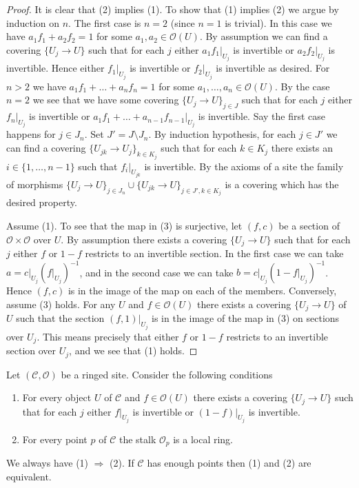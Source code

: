\begin{proof}
It is clear that (2) implies (1). To show that (1) implies (2) we argue by
induction on $n$. The first case is $n = 2$ (since $n = 1$ is trivial).
In this case we have $a_1f_1 + a_2f_2 = 1$ for some
$a_1, a_2 \in \mathcal{O}(U)$. By assumption we can find a covering
$\{U_j \to U\}$ such that for each $j$
either $a_1f_1|_{U_j}$ is invertible or $a_2f_2|_{U_j}$ is invertible.
Hence either $f_1|_{U_j}$ is invertible or $f_2|_{U_j}$ is invertible
as desired. For $n > 2$ we have
$a_1f_1 + \ldots + a_nf_n = 1$ for some $a_1, \ldots, a_n \in \mathcal{O}(U)$. 
By the case $n = 2$ we see that we have some covering $\{U_j \to U\}_{j \in J}$
such that for each $j$ either $f_n|_{U_j}$ is invertible or
$a_1f_1 + \ldots + a_{n - 1}f_{n - 1}|_{U_j}$ is invertible.
Say the first case happens for $j \in J_n$. Set $J' = J \setminus J_n$.
By induction hypothesis, for each $j \in J'$ we can find a covering
$\{U_{jk} \to U_j\}_{k \in K_j}$ such that for each $k \in K_j$ there
exists an $i \in \{1, \ldots, n - 1\}$ such that 
$f_i|_{U_{jk}}$ is invertible. By the axioms of a site the family of
morphisms
$\{U_j \to U\}_{j \in J_n} \cup \{U_{jk} \to U\}_{j \in J', k \in K_j}$
is a covering which has the desired property.

\medskip\noindent
Assume (1). To see that the map in (3) is surjective, let
$(f, c)$ be a section of $\mathcal{O} \times \mathcal{O}$ over $U$.
By assumption there exists a covering $\{U_j \to U\}$ such that
for each $j$ either $f$ or $1 - f$ restricts to an invertible section.
In the first case we can take $a = c|_{U_j} (f|_{U_j})^{-1}$, and
in the second case we can take $b = c|_{U_j} (1 - f|_{U_j})^{-1}$.
Hence $(f, c)$ is in the image of the map on each of the members.
Conversely, assume (3) holds. For any $U$ and $f \in \mathcal{O}(U)$
there exists a covering $\{U_j \to U\}$ of $U$ such that the
section $(f, 1)|_{U_j}$ is in the image of the map in (3) on sections
over $U_j$. This means precisely that either $f$ or $1 - f$ restricts
to an invertible section over $U_j$, and we see that (1) holds.
\end{proof}

\begin{lemma}
\label{lemma-locally-ringed-stalk}
Let $(\mathcal{C}, \mathcal{O})$ be a ringed site.
Consider the following conditions
\begin{enumerate}
\item For every object $U$ of $\mathcal{C}$ and $f \in \mathcal{O}(U)$
there exists a covering $\{U_j \to U\}$ such that for each $j$
either $f|_{U_j}$ is invertible or $(1 - f)|_{U_j}$ is invertible.
\item For every point $p$ of $\mathcal{C}$ the stalk $\mathcal{O}_p$
is a local ring.
\end{enumerate}
We always have (1) $\Rightarrow$ (2). If $\mathcal{C}$ has enough points
then (1) and (2) are equivalent.
\end{lemma}

